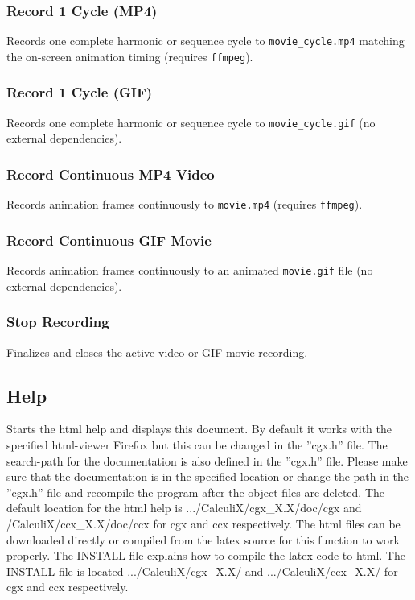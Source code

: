 \documentclass{article}
\begin{document}
\subsubsection{\label{Record 1 Cycle (MP4)}Record 1 Cycle (MP4)}
Records one complete harmonic or sequence cycle to \texttt{movie\_cycle.mp4} matching the on-screen animation timing (requires \texttt{ffmpeg}).

\subsubsection{\label{Record 1 Cycle (GIF)}Record 1 Cycle (GIF)}
Records one complete harmonic or sequence cycle to \texttt{movie\_cycle.gif} (no external dependencies).

\subsubsection{\label{Record Continuous MP4 Video}Record Continuous MP4 Video}
Records animation frames continuously to \texttt{movie.mp4} (requires \texttt{ffmpeg}).

\subsubsection{\label{Record Continuous GIF Movie}Record Continuous GIF Movie}
Records animation frames continuously to an animated \texttt{movie.gif} file (no external dependencies).

\subsubsection{\label{Stop Recording}Stop Recording}
Finalizes and closes the active video or GIF movie recording.

\subsection{\label{Help}Help}
Starts the html help and displays this document. By default it works with the specified html-viewer Firefox \cite{Firefox} but this can be changed in the ''cgx.h'' file. The search-path for the documentation is also defined in the ''cgx.h'' file. Please make sure that the documentation is in the specified location or change the path in the ''cgx.h'' file and recompile the program after the object-files are deleted.  The default location for the html help is .../CalculiX/cgx\_X.X/doc/cgx and /CalculiX/ccx\_X.X/doc/ccx for cgx and ccx respectively.  The html files can be downloaded directly or compiled from the latex source for this function to work properly. The INSTALL file explains how to compile the latex code to html.  The INSTALL file is located .../CalculiX/cgx\_X.X/ and .../CalculiX/ccx\_X.X/ for cgx and ccx respectively.
\end{document}
